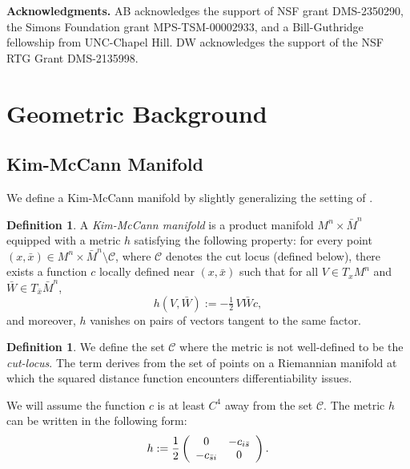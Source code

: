 \documentclass[12pt,letterpaper]{amsart}%
\newcounter{mycounter}
\numberwithin{mycounter}{section}
\theoremstyle{plain}
\numberwithin{equation}{section}
\theoremstyle{definition}
\newtheorem{definition}[mycounter]{Definition}
\begin{document}
\noindent\textbf{Acknowledgments.} AB acknowledges
the support of NSF grant DMS-2350290, the Simons Foundation grant MPS-TSM-00002933, and a Bill-Guthridge fellowship from UNC-Chapel Hill. DW acknowledges
the support of the NSF RTG Grant DMS-2135998.





\section{Geometric Background}


\subsection{Kim-McCann Manifold} 


\medskip

We define a Kim-McCann manifold by slightly generalizing the setting of \cite{KM}. 

\begin{definition}\label{def:km}\label{def:km}
A  \textit{Kim-McCann manifold} is a product manifold $M^n\times \bar{M}^n$ equipped with a metric $h$ satisfying the following property: for every point $(x,\bar{x}) \in M^n\times \bar{M}^n\setminus \mathscr{C}$, where $\mathscr{C}$ denotes the cut locus (defined below), there exists a function $c$ locally defined near $(x,\bar{x})$ such that for all $V \in T_{x}M^n$ and $\bar{W} \in T_{\bar{x}}\bar{M}^n$, 
\[
h(V,\bar{W}) := -\tfrac{1}{2}\,V\bar{W}c,
\]
and moreover, $h$ vanishes on pairs of vectors tangent to the same factor.
\end{definition}
 



 
\begin{definition}\label{def:cut}
We define the set $\mathscr{C}$ where the metric is not well-defined to be the \textit{cut-locus}. The term derives from the set of points on a Riemannian manifold at which the squared distance function encounters differentiability issues.
\end{definition}

We will assume the function $c$ is at least $C^4$ away from the set $\mathscr{C}$. 
 The metric $h$ can be written in the following form:
\[
h:=\frac{1}{2}\left(
\begin{array}
[c]{cc}%
0 & -c_{i\bar{s}}\\
-c_{\bar{s}i} & 0
\end{array}
\right)  .
\]
\end{document}
